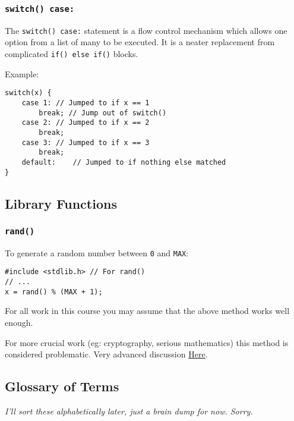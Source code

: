 \documentclass{lab}
\begin{document}
\begin{multicols}{2}
\subsubsection{\texttt{switch() case:}}

The \texttt{switch() case:} statement is a flow control mechanism which allows one option from a list of many to be executed. It is a neater replacement from complicated \texttt{if() else if()} blocks.

Example:

\begin{lstlisting}[style=CStyle]
switch(x) {
	case 1: // Jumped to if x == 1
		break; // Jump out of switch()
 	case 2: // Jumped to if x == 2
		break;
	case 3: // Jumped to if x == 3
		break;
	default:	// Jumped to if nothing else matched
}
\end{lstlisting}


\subsection{Library Functions}
\subsubsection{\texttt{rand()}}

To generate a random number between \texttt{0} and \texttt{MAX}:

\begin{lstlisting}[style=CStyle]
#include <stdlib.h> // For rand()
// ...
x = rand() % (MAX + 1);
\end{lstlisting}

For all work in this course you may assume that the above method works well enough.

For more crucial work (eg: cryptography, serious mathematics) this method is considered problematic. Very advanced discussion \underline{\href{http://www.azillionmonkeys.com/qed/random.html}{Here}}.

\subsection{Glossary of Terms}

\textit{I'll sort these alphabetically later, just a brain dump for now. Sorry.}


\end{multicols}
\end{document}
